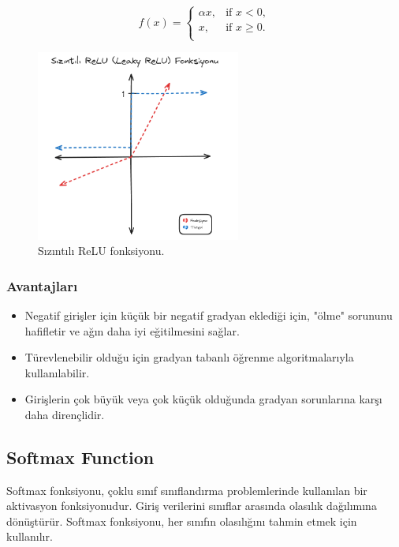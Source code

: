 \[f(x) = \begin{cases} 
\alpha x, & \text{if } x < 0, \\
x, & \text{if } x \geq 0. \\
\end{cases}
\]

\begin{figure}[h]
    \centering
    \includegraphics[width=0.6\textwidth]{images/leaky_relu_function.png}
    \caption{Sızıntılı ReLU fonksiyonu.}
    \label{fig:enter-label}
\end{figure}

\subsubsection{Avantajları}
\begin{itemize}
    \item Negatif girişler için küçük bir negatif gradyan eklediği için, "ölme" sorununu hafifletir ve ağın daha iyi eğitilmesini sağlar.
    \item Türevlenebilir olduğu için gradyan tabanlı öğrenme algoritmalarıyla kullanılabilir.
    \item Girişlerin çok büyük veya çok küçük olduğunda gradyan sorunlarına karşı daha dirençlidir.
\end{itemize}

\newpage

\subsection{Softmax Function}
Softmax fonksiyonu, çoklu sınıf sınıflandırma problemlerinde kullanılan bir aktivasyon fonksiyonudur. Giriş verilerini sınıflar arasında olasılık dağılımına dönüştürür. Softmax fonksiyonu, her sınıfın olasılığını tahmin etmek için kullanılır.

